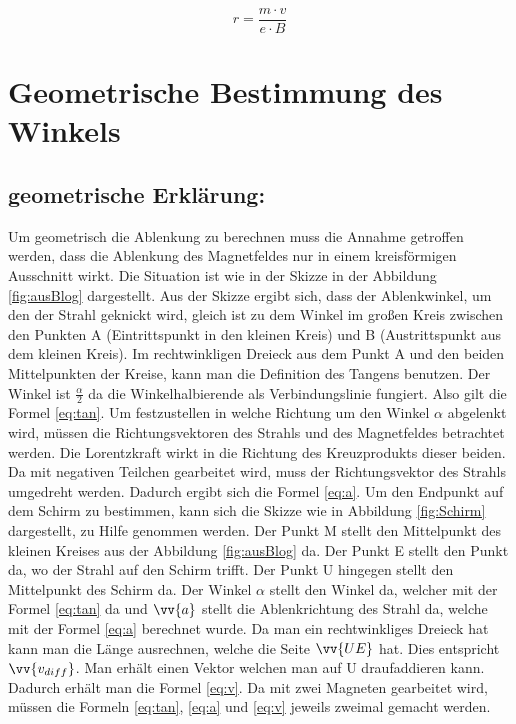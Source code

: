 \begin{equation}
     \label{eq:r}
     r = \frac{m \cdot v}{e \cdot B}
\end{equation}

\section{Geometrische Bestimmung des Winkels}

\subsection{geometrische Erklärung:}

Um geometrisch die Ablenkung zu berechnen muss die Annahme getroffen werden, dass die Ablenkung des Magnetfeldes nur in einem kreisförmigen Ausschnitt wirkt.
Die Situation ist wie in der Skizze in der Abbildung \ref{fig:ausBlog} dargestellt.\cite{Blog}
Aus der Skizze ergibt sich, dass der Ablenkwinkel, um den der Strahl geknickt wird, gleich ist zu dem Winkel im großen Kreis zwischen den Punkten A (Eintrittspunkt in den kleinen Kreis) und B (Austrittspunkt aus dem kleinen Kreis).
Im rechtwinkligen Dreieck aus dem Punkt A und den beiden Mittelpunkten der Kreise, kann man die Definition des Tangens benutzen.
Der Winkel ist $\frac{\alpha}{2}$ da die Winkelhalbierende als Verbindungslinie fungiert.
Also gilt die Formel \ref{eq:tan}.
Um festzustellen in welche Richtung um den Winkel $\alpha$ abgelenkt wird, müssen die Richtungsvektoren des Strahls und des Magnetfeldes betrachtet werden.
Die Lorentzkraft wirkt in die Richtung des Kreuzprodukts dieser beiden.
Da mit negativen Teilchen gearbeitet wird, muss der Richtungsvektor des Strahls umgedreht werden. Dadurch ergibt sich die Formel \ref{eq:a}.
Um den Endpunkt auf dem Schirm zu bestimmen, kann sich die Skizze wie in Abbildung \ref{fig:Schirm} dargestellt, zu Hilfe genommen werden.
Der Punkt M stellt den Mittelpunkt des kleinen Kreises aus der Abbildung \ref{fig:ausBlog} da.
Der Punkt E stellt den Punkt da, wo der Strahl auf den Schirm trifft. Der Punkt U hingegen stellt den Mittelpunkt des Schirm da.
Der Winkel $\alpha$ stellt den Winkel da, welcher mit der Formel \ref{eq:tan} da und $\vv{a}$ stellt die Ablenkrichtung des Strahl da, welche mit der Formel \ref{eq:a} berechnet wurde.
Da man ein rechtwinkliges Dreieck hat kann man die Länge ausrechnen, welche die Seite $\vv{UE}$ hat.
Dies entspricht $\vv{v_{diff}}$.
Man erhält einen Vektor welchen man auf U draufaddieren kann.
Dadurch erhält man die Formel \ref{eq:v}.
Da mit zwei Magneten gearbeitet wird, müssen die Formeln \ref{eq:tan}, \ref{eq:a} und \ref{eq:v} jeweils zweimal gemacht werden.
